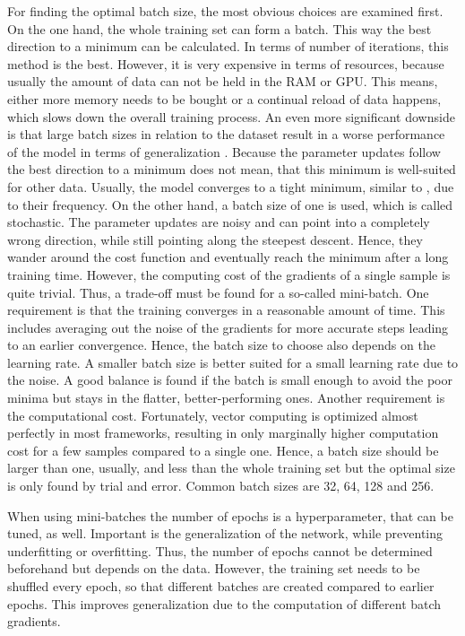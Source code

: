 For finding the optimal batch size, the most obvious choices are examined first.
On the one hand, the whole training set can form a batch.
This way the best direction to a minimum can be calculated.
In terms of number of iterations, this method is the best.
However, it is very expensive in terms of resources, because usually the amount of data can not be held in the RAM or GPU.
This means, either more memory needs to be bought or a continual reload of data happens, which slows down the overall training process.
An even more significant downside is that large batch sizes in relation to the dataset result in a worse performance of the model in terms of generalization \cite{DBLP:journals/corr/KeskarMNST16}.
Because the parameter updates follow the best direction to a minimum does not mean, that this minimum is well-suited for other data.
Usually, the model converges to a tight minimum, similar to , due to their frequency.
On the other hand, a batch size of one is used, which is called stochastic.
The parameter updates are noisy and can point into a completely wrong direction, while still pointing along the steepest descent.
Hence, they wander around the cost function and eventually reach the minimum after a long training time.
However, the computing cost of the gradients of a single sample is quite trivial.
Thus, a trade-off must be found for a so-called mini-batch.
One requirement is that the training converges in a reasonable amount of time.
This includes averaging out the noise of the gradients for more accurate steps leading to an earlier convergence.
Hence, the batch size to choose also depends on the learning rate.
A smaller batch size is better suited for a small learning rate due to the noise.
A good balance is found if the batch is small enough to avoid the poor minima but stays in the flatter, better-performing ones.
Another requirement is the computational cost.
Fortunately, vector computing is optimized almost perfectly in most frameworks, resulting in only marginally higher computation cost for a few samples compared to a single one.
Hence, a batch size should be larger than one, usually, and less than the whole training set but the optimal size is only found by trial and error.
Common batch sizes are 32, 64, 128 and 256.

When using mini-batches the number of epochs is a hyperparameter, that can be tuned, as well.
Important is the generalization of the network, while preventing underfitting or overfitting.
Thus, the number of epochs cannot be determined beforehand but depends on the data.
However, the training set needs to be shuffled every epoch, so that different batches are created compared to earlier epochs.
This improves generalization due to the computation of different batch gradients.